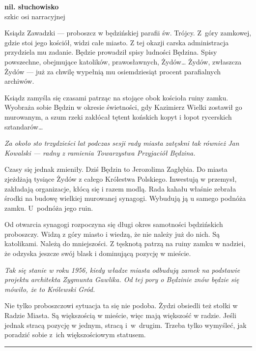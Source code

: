 \documentclass[11pt,a4paper,oneside]{article}
\begin{document}
\noindent
\textbf{nil. słuchowisko}\\
szkic osi narracyjnej

\noindent
Ksiądz Zawadzki --- proboszcz w będzińskiej parafii św. Trójcy.
Z~góry zamkowej, gdzie stoi jego kościół, widzi całe miasto.  Z tej
okazji carska administracja przydziela mu zadanie. Będzie prowadził
spisy ludności Będzina.  Spisy powszechne, obejmujące katolików,
prawosławnych, Żydów\dots{} Żydów, zwłaszcza Żydów --- już za chwilę
wypełnią mu osiemdziesiąt procent parafialnych archiwów. 

Ksiądz zamyśla się czasami patrząc na stojące obok kościoła ruiny
zamku.  Wyobraża sobie Będzin w okresie świetności, gdy Kazimierz
Wielki zostawił go murowanym, a szum rzeki zakłócał tętent końskich
kopyt i łopot rycerskich sztandarów\dots{}

\footnotesize{\emph{Za  około sto trzydzieści lat podczas sesji rady
miasta zatęskni tak również Jan Kowalski --- radny z ramienia
Towarzystwa Przyjaciół Będzina.}}

\normalsize
Czasy się jednak zmieniły. Dziś Będzin to Jerozolima Zagłębia. Do miasta
zjeżdżają tysiące Żydów z całego Królestwa Polskiego. Inwestują
w przemysł, zakładają organizacje, kłócą się i razem modlą. Rada
kahału właśnie zebrała środki na budowę wielkiej murowanej synagogi.
Wybudują ją u samego podnóża zamku. U~podnóża jego ruin.

Od otwarcia synagogi rozpoczyna się długi okres samotności będzińskich
proboszczy. Widzą z góry miasto i wiedzą, że nie należy już do nich.
Są katolikami. Należą do mniejszości. Z tęsknotą patrzą na ruiny zamku w nadziei,
że odzyska jeszcze swój blask i dominującą pozycję w mieście. 

\footnotesize{\emph{Tak się stanie w roku 1956, kiedy władze miasta
odbudują zamek na podstawie projektu architekta Zygmunta Gawlika. Od
tej pory o Będzinie znów będzie się mówiło, że to Królewski Gród.}}

\normalsize
Nie tylko proboszczowi sytuacja ta się nie podoba. Żydzi obsiedli też
stołki w Radzie Miasta. Są większością w mieście, więc mają większość
w radzie. Jeśli jednak stracą pozycję w jednym, stracą i~w~drugim. Trzeba
tylko wymyśleć, jak poradzić sobie z~ich większościowym statusem. 

\hrule
\end{document}
